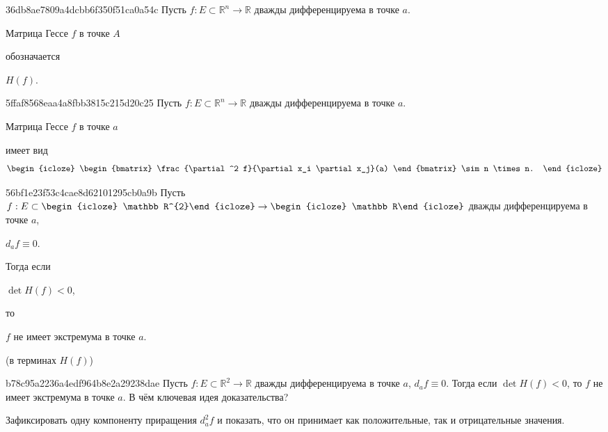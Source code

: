 \begin{note}{36db8ae7809a4dcbb6f350f51ca0a54c}
    Пусть \({ f : E \subset \mathbb R^{n} \to \mathbb R }\) дважды дифференцируема в точке \({ a }\).
    \begin{icloze}{2}Матрица Гессе \({ f }\) в точке \({ A }\)\end{icloze} обозначается \begin{icloze}{1}\({ H(f) }\).\end{icloze}
\end{note}

\begin{note}{5ffaf8568eaa4a8fbb3815c215d20c25}
    Пусть \({ f : E \subset \mathbb R^{n} \to \mathbb R }\) дважды дифференцируема в точке \({ a }\).
    \begin{icloze}{2}Матрица Гессе \({ f }\) в точке \({ a }\)\end{icloze} имеет вид
    \[
        \begin{icloze}{1}
            \begin{bmatrix}
                \frac{\partial^2 f}{\partial x_i \partial x_j}(a)
            \end{bmatrix}
            \sim n \times n.
        \end{icloze}
    \]
\end{note}

\begin{note}{56bf1e23f53c4cae8d62101295cb0a9b}
    Пусть \({ f : E \subset \begin{icloze}{3}\mathbb R^{2}\end{icloze} \to \begin{icloze}{3}\mathbb R\end{icloze} }\) дважды дифференцируема в точке \({ a }\), \begin{icloze}{4}\({ d_{a}f \equiv 0 }\).\end{icloze}
    Тогда если \begin{icloze}{2}\({ \det H(f) < 0 }\),\end{icloze} то \begin{icloze}{1}\({ f }\) не имеет экстремума в точке \({ a }\).\end{icloze}

    \begin{center}
        \tiny
        (в терминах \({ H(f) }\))
    \end{center}
\end{note}

\begin{note}{b78c95a2236a4edf964b8e2a29238dae}
    Пусть \({ f : E \subset \mathbb R^{2} \to \mathbb R }\) дважды дифференцируема в точке \({ a }\), \({ d_{a}f \equiv 0 }\).
    Тогда если \({ \det H(f) < 0 }\), то \({ f }\) не имеет экстремума в точке \({ a }\).
    В чём ключевая идея доказательства?

    \begin{cloze}{1}
        Зафиксировать одну компоненту приращения \({ d_{a}^2f }\) и показать, что он принимает как положительные, так и отрицательные значения.
    \end{cloze}
\end{note}

